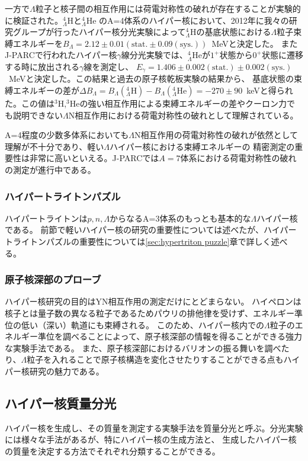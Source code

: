 \documentclass[a4paper,11pt,uplatex]{jsbook}
\begin{document}
一方で$\Lambda$粒子と核子間の相互作用には荷電対称性の破れが存在することが実験的に検証された。$^4_\Lambda \text{H}$と$^4_\Lambda \text{He}$
のA=4体系のハイパー核において、2012年に我々の研究グループが行ったハイパー核分光実験によって$^4_\Lambda \text{H}$の基底状態における$\Lambda$粒子束縛エネルギーを$B_\Lambda = 2.12 \pm 0.01 (\text{stat.} \pm 0.09 (\text{sys.}))$~MeVと決定した\cite{esserObservation4Hyperhydrogen2015,NagaoD}。
またJ-PARCで行われたハイパー核$\gamma$線分光実験では、$^4_\Lambda \text{He}$が$1^+$状態から$0^+$状態に遷移する時に放出される$\gamma$線を測定し、
$E_\gamma = 1.406 \pm 0.002(\text{stat.}) \pm 0.002 (\text{sys.})$~MeVと決定した\cite{yamamoto2015}。この結果と過去の原子核乾板実験の結果から、
基底状態の束縛エネルギーの差が$\Delta B_\Lambda = B_\Lambda(^4_\Lambda\text{H}) - B_\Lambda(^4_\Lambda\text{He}) = -270 \pm 90$~keVと得られた。この値は$^3\text{H}$,$^3\text{He}$の強い相互作用による束縛エネルギーの差やクーロン力でも説明できない$\Lambda$N相互作用における荷電対称性の破れとして理解されている。

A=4程度の少数多体系においても$\Lambda$N相互作用の荷電対称性の破れが依然として理解が不十分であり、軽い$\Lambda$ハイパー核における束縛エネルギーの
精密測定の重要性は非常に高いといえる。J-PARCでは$A=7$体系における荷電対称性の破れの測定が進行中である。
\subsubsection{ハイパートライトンパズル}
ハイパートライトンは$p,n,\Lambda$からなるA=3体系のもっとも基本的な$\Lambda$ハイパー核である。
前節で軽いハイパー核の研究の重要性については述べたが、ハイパートライトンパズルの重要性については\ref{sec:hypertriton puzzle}章で詳しく述べる。
\subsubsection{原子核深部のプローブ}
ハイパー核研究の目的はYN相互作用の測定だけにとどまらない。
ハイペロンは核子とは量子数の異なる粒子であるためパウリの排他律を受けず、エネルギー準位の低い（深い）軌道にも束縛される。
このため、ハイパー核内での$\Lambda$粒子のエネルギー準位を調べることによって、原子核深部の情報を得ることができる強力な実験手法である。
また、原子核深部におけるバリオンの振る舞いを調べたり、$\Lambda$粒子を入れることで原子核構造を変化させたりすることができる点もハイパー核研究の魅力である。

\subsection{ハイパー核質量分光}
ハイパー核を生成し、その質量を測定する実験手法を質量分光と呼ぶ。分光実験には様々な手法があるが、特にハイパー核の生成方法と、
生成したハイパー核の質量を決定する方法でそれぞれ分類することができる。
\end{document}
